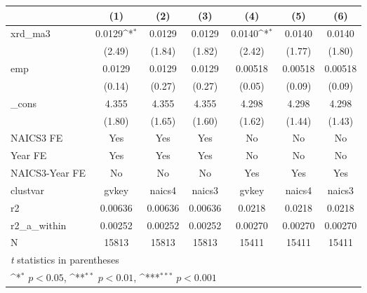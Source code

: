 {
\def\sym#1{\ifmmode^{#1}\else\(^{#1}\)\fi}
\begin{tabular}{l*{6}{c}}
\hline\hline
            &\multicolumn{1}{c}{(1)}         &\multicolumn{1}{c}{(2)}         &\multicolumn{1}{c}{(3)}         &\multicolumn{1}{c}{(4)}         &\multicolumn{1}{c}{(5)}         &\multicolumn{1}{c}{(6)}         \\
\hline
xrd\_ma3     &      0.0129\sym{*}  &      0.0129         &      0.0129         &      0.0140\sym{*}  &      0.0140         &      0.0140         \\
            &      (2.49)         &      (1.84)         &      (1.82)         &      (2.42)         &      (1.77)         &      (1.80)         \\
[1em]
emp         &      0.0129         &      0.0129         &      0.0129         &     0.00518         &     0.00518         &     0.00518         \\
            &      (0.14)         &      (0.27)         &      (0.27)         &      (0.05)         &      (0.09)         &      (0.09)         \\
[1em]
\_cons      &       4.355         &       4.355         &       4.355         &       4.298         &       4.298         &       4.298         \\
            &      (1.80)         &      (1.65)         &      (1.60)         &      (1.62)         &      (1.44)         &      (1.43)         \\
[1em]
NAICS3 FE   &         Yes         &         Yes         &         Yes         &          No         &          No         &          No         \\
[1em]
Year FE     &         Yes         &         Yes         &         Yes         &          No         &          No         &          No         \\
[1em]
NAICS3-Year FE&          No         &          No         &          No         &         Yes         &         Yes         &         Yes         \\
\hline
clustvar    &       gvkey         &      naics4         &      naics3         &       gvkey         &      naics4         &      naics3         \\
r2          &     0.00636         &     0.00636         &     0.00636         &      0.0218         &      0.0218         &      0.0218         \\
r2\_a\_within &     0.00252         &     0.00252         &     0.00252         &     0.00270         &     0.00270         &     0.00270         \\
N           &       15813         &       15813         &       15813         &       15411         &       15411         &       15411         \\
\hline\hline
\multicolumn{7}{l}{\footnotesize \textit{t} statistics in parentheses}\\
\multicolumn{7}{l}{\footnotesize \sym{*} \(p<0.05\), \sym{**} \(p<0.01\), \sym{***} \(p<0.001\)}\\
\end{tabular}
}
